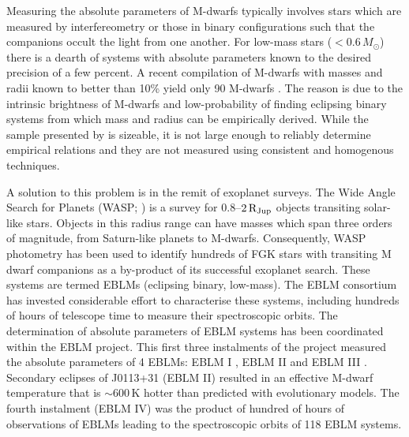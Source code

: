 Measuring the absolute parameters of M-dwarfs typically involves stars which are measured by interfereometry or those in binary configurations such that the companions occult the light from one another.  For low-mass stars ($< 0.6\,M_\odot$) there is a dearth of systems with absolute parameters known to the desired precision of a few percent. A recent compilation of M-dwarfs with masses and radii known to better than 10\% yield only 90 M-dwarfs \citep{2018arXiv180505841C}. The reason is due to the intrinsic brightness of M-dwarfs and low-probability of finding eclipsing binary systems from which mass and radius can be empirically derived. While the sample presented by  \citep{2018arXiv180505841C} is sizeable, it is not large enough to reliably determine empirical relations and they are not measured using consistent and homogenous techniques.

A solution to this problem is in the remit of exoplanet surveys. The Wide Angle Search for Planets  (WASP; \citealt{2006PASP..118.1407P})  is a survey for $0.8$--$ 2 \rm \, R_{Jup}$ objects transiting solar-like stars. Objects in this radius range can have masses which span three orders of magnitude, from Saturn-like planets to M-dwarfs. Consequently, WASP photometry has been used to identify hundreds of FGK stars with transiting M dwarf companions as a by-product of its successful exoplanet search. These systems are termed EBLMs (eclipsing binary, low-mass). The EBLM consortium has invested considerable effort to characterise these systems, including hundreds of hours of telescope time to measure their spectroscopic orbits. The determination of absolute parameters of EBLM systems has been coordinated within the EBLM project. This first three instalments of the project measured the absolute parameters of 4 EBLMs: EBLM I \citep{2013A&A...549A..18T}, EBLM II \citep{2014A&A...572A..50G} and EBLM III \citep{vonBoetticher2017}. Secondary eclipses of J0113+31 (EBLM II) resulted in an effective M-dwarf temperature that is $\sim600$\,K hotter than predicted with evolutionary models. The fourth instalment (EBLM IV) was the product of hundred of hours of observations of EBLMs leading to the spectroscopic orbits of 118 EBLM systems.  




